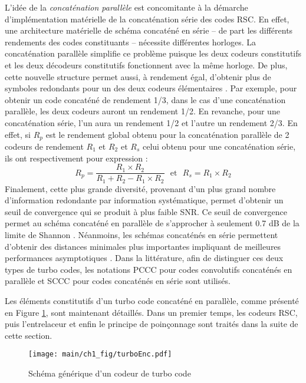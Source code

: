 L'idée de la \emph{concaténation parallèle} est concomitante à la démarche d'implémentation matérielle de la 
concaténation série des codes RSC. En effet, une architecture matérielle de schéma concaténé en série -- de part les 
différents rendements des codes constituants -- nécessite différentes horloges. La concaténation parallèle simplifie ce
problème puisque les deux codeurs constitutifs et les deux décodeurs constitutifs fonctionnent avec la même horloge. De plus,
cette nouvelle structure permet aussi, à rendement égal, d'obtenir plus de symboles redondants pour un des deux codeurs 
élémentaires 
. Par exemple, pour obtenir un code concaténé de rendement 1/3, 
dans le cas d'une concaténation parallèle, les deux codeurs auront un rendement 1/2. En revanche, pour une
concaténation série, l'un aura un rendement 1/2 et l'autre un rendement 2/3. En effet, si $R_p$ est le rendement 
global obtenu pour la concaténation parallèle de 2 codeurs de rendement $R_1$ et $R_2$ et $R_s$ celui obtenu pour une 
concaténation série, ils ont respectivement pour expression : 
\[R_p = \frac{R_1 \times R_2}{R_1 + R_2 - R_1 \times R_2} \ \ \ \text{et} \ \ \ R_s = R_1 \times R_2\]
Finalement, cette plus grande diversité, provenant d'un plus grand nombre d'information redondante par information 
systématique, permet d'obtenir un seuil de convergence qui se produit à plus faible SNR. Ce 
seuil de convergence permet au schéma concaténé en parallèle de s'approcher à seulement 0.7 dB de la limite de Shannon 
\cite{berrouTC}. Néanmoins, les schémas concaténés en série permettent d'obtenir des distances minimales plus 
importantes impliquant de meilleures performances asymptotiques \cite{declercq2014channel}. Dans la littérature, afin de distinguer
ces deux types de turbo codes, les notations PCCC pour codes convolutifs concaténés en parallèle et SCCC pour codes
concaténés en série sont utilisés.

Les éléments constitutifs d'un turbo code concaténé en parallèle, comme présenté en Figure \ref{fig:turboEnc}, sont 
maintenant détaillés. Dans un premier temps, les codeurs RSC, puis l'entrelaceur et enfin le principe de poinçonnage sont 
traités dans la suite de cette section.

\begin{figure}[!h]
	\centering
	\texttt{[image: main/ch1\_fig/turboEnc.pdf]}
	\caption{\label{fig:turboEnc} Schéma générique d'un codeur de turbo code}
\end{figure}


